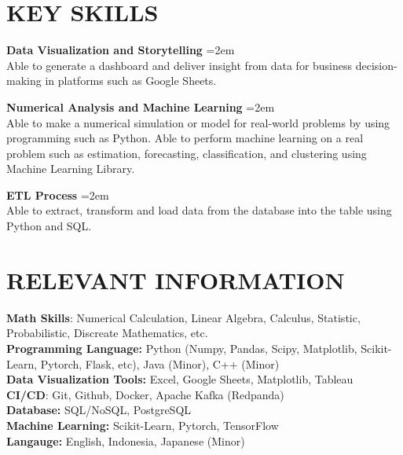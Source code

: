 \documentclass[paper=a4,fontsize=10pt]{scrartcl} %
\newcommand{\sepspace}{\vspace*{1em}}		%
\newcommand{\NewPart}[1]{\section*{\uppercase{#1}}}
\newcommand{\KerjaEntry}[2]{
		\noindent \textbf{#1} \hfill      %
		\noindent\hangindent=2em\hangafter=0 \small #2 %
		\normalsize \par}
\begin{document}
\NewPart{KEY Skills}{}

\KerjaEntry{Data Visualization and Storytelling}{\\Able to generate a dashboard and deliver insight from data for business decision-making in platforms such as Google Sheets.
}

\sepspace

\KerjaEntry{Numerical Analysis and Machine Learning}{\\Able to make a numerical simulation or model for real-world problems by using programming such as Python. Able to perform machine learning on a real problem such as estimation, forecasting, classification, and clustering using Machine Learning Library.
}

\sepspace

\KerjaEntry{ETL Process}{\\Able to extract, transform and load data from the database into the table using Python and SQL.
}

\NewPart{RELEVANT INFORMATION}{}
\textbf{Math Skills}: Numerical Calculation, Linear Algebra, Calculus, Statistic, Probabilistic, Discreate Mathematics, etc.\\
\textbf{Programming Language:} Python (Numpy, Pandas, Scipy, Matplotlib, Scikit-Learn, Pytorch, Flask, etc), Java (Minor), C++ (Minor)\\
\textbf{Data Visualization Tools:}  Excel, Google Sheets, Matplotlib, Tableau\\
\textbf{CI/CD}: Git, Github, Docker, Apache Kafka (Redpanda) \\
\textbf{Database:} SQL/NoSQL, PostgreSQL \\
\textbf{Machine Learning:} Scikit-Learn, Pytorch, TensorFlow\\
\textbf{Langauge:} English, Indonesia, Japanese (Minor) \\
\end{document}

